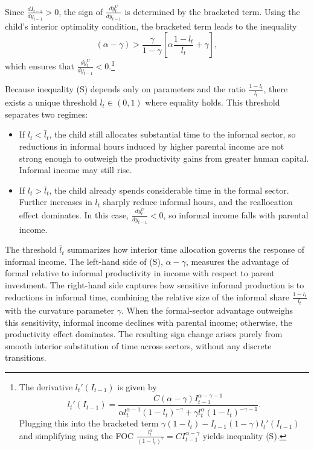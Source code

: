 \documentclass[12pt]{article}
\begin{document}
Since \(\frac{dI_{t-1}}{dy_{t-1}}>0\), the sign of \(\frac{d y_t^U}{dy_{t-1}}\) is determined by the bracketed term.  
Using the child’s interior optimality condition, the bracketed term leads to the inequality
\[
(\alpha-\gamma)
> \frac{\gamma}{1-\gamma}
\left[\alpha\frac{1-l_t}{l_t}+\gamma\right],
\tag{S}
\]
which ensures that \(\frac{d y_t^U}{dy_{t-1}}<0\).\footnote{The derivative \(l_t'(I_{t-1})\) is given by
\[
l_t'(I_{t-1}) = \frac{C(\alpha-\gamma)I_{t-1}^{\alpha-\gamma-1}}
{\alpha l_t^{\alpha-1}(1-l_t)^{-\gamma} + \gamma l_t^{\alpha}(1-l_t)^{-\gamma-1}}.
\]
Plugging this into the bracketed term \(\gamma(1-l_t) - I_{t-1}(1-\gamma) l_t'(I_{t-1})\) and simplifying using the FOC \(\frac{l_t^\alpha}{(1-l_t)^\gamma} = C I_{t-1}^{\alpha-\gamma}\) yields inequality (S).}

Because inequality (S) depends only on parameters and the ratio \(\frac{1-l_t}{l_t}\), there exists a unique threshold \(\bar l_t \in (0,1)\) where equality holds. This threshold separates two regimes:
\begin{itemize}
\item If \(l_t < \bar l_t\), the child still allocates substantial time to the informal sector, so reductions in informal hours induced by higher parental income are not strong enough to outweigh the productivity gains from greater human capital. Informal income may still rise.
\item If \(l_t > \bar l_t\), the child already spends considerable time in the formal sector. Further increases in \(l_t\) sharply reduce informal hours, and the reallocation effect dominates. In this case, $\frac{d y_t^U}{dy_{t-1}} < 0$, so informal income falls with parental income.
\end{itemize}



The threshold \(\bar l_t\) summarizes how interior time allocation governs the response of informal income. The left-hand side of (S), \(\alpha-\gamma\), measures the advantage of formal relative to informal productivity in income with respect to parent investment. The right-hand side captures how sensitive informal production is to reductions in informal time, combining the relative size of the informal share \(\tfrac{1-l_t}{l_t}\) with the curvature parameter \(\gamma\). When the formal-sector advantage outweighs this sensitivity, informal income declines with parental income; otherwise, the productivity effect dominates. The resulting sign change arises purely from smooth interior substitution of time across sectors, without any discrete transitions.
\end{document}
